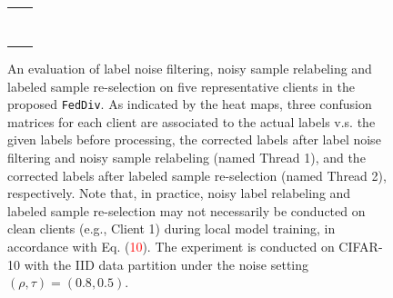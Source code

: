 \documentclass[letterpaper]{article} %
\begin{document}
\begin{figure}[t]
\begin{tabular}{cccccccc}
    \multicolumn{2}{c}{} & \multicolumn{6}{c}{} \\
    \multicolumn{2}{c}{} & \multicolumn{6}{c}{} \\
    \multicolumn{2}{c}{} & \multicolumn{6}{c}{} \\
    \multicolumn{2}{c}{} & \multicolumn{6}{c}{} \\
    \multicolumn{2}{c}{} & \multicolumn{6}{c}{} \\
    \multicolumn{2}{c}{} & \multicolumn{6}{c}{} \\
    \multicolumn{2}{c}{} & \multicolumn{6}{c}{} \\
    \multicolumn{2}{c}{} & \multicolumn{6}{c}{} \\
    \end{tabular}%

    \caption{An evaluation of label noise filtering, noisy sample relabeling and labeled sample re-selection on five representative clients in the proposed \texttt{FedDiv}.  As indicated by the heat maps, three confusion matrices for each client are associated to the actual labels v.s. the given labels before processing, the corrected labels after label noise filtering and noisy sample relabeling (named Thread 1), and the corrected labels after labeled sample re-selection (named Thread 2), respectively.
    Note that, in practice, noisy label relabeling and labeled sample re-selection may not necessarily be conducted on clean clients (e.g., Client 1) during local model training, in accordance with Eq. (\textcolor{red}{10}).
    The experiment is conducted on CIFAR-10 with the IID data partition under the noise setting $(\rho, \tau)=(0.8, 0.5)$. }

  \label{Figure:Heatmap}%
\end{figure}%
\end{document}
